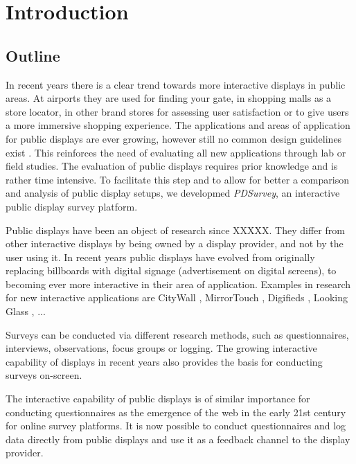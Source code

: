 \section{Introduction}
\label{sec:introduction}


\subsection{Outline}

	In recent years there is a clear trend towards more interactive displays in public areas. At airports they are used for finding your gate, in shopping malls as a store locator, in other brand stores for assessing user satisfaction or to give users a more immersive shopping experience. The applications and areas of application for public displays are ever growing, however still no common design guidelines exist \cite{Alt2012HowToEvaluate}. This reinforces the need of evaluating all new applications through lab or field studies. The evaluation of public displays requires prior knowledge and is rather time intensive. To facilitate this step and to allow for better a comparison and analysis of public display setups, we developmed \textit{PDSurvey}, an interactive public display survey platform.

	Public displays have been an object of research since XXXXX. They differ from other interactive displays by being owned by a display provider, and not by the user using it. In recent years public displays have evolved from originally replacing billboards with digital signage (advertisement on digital screens), to becoming ever more interactive in their area of application. Examples in research for new interactive applications are CityWall \cite{peltonen2008s}, MirrorTouch \cite{muller2014mirrortouch}, Digifieds \cite{}, Looking Glass \cite{}, ...


	Surveys can be conducted via different research methods, such as questionnaires, interviews, observations, focus groups or logging. The growing interactive capability of displays in recent years also provides the basis for conducting surveys on-screen. 

	 The interactive capability of public displays is of similar importance for conducting questionnaires as the emergence of the web in the early 21st century for online survey platforms. It is now possible to conduct questionnaires and log data directly from public displays and use it as a feedback channel to the display provider.



